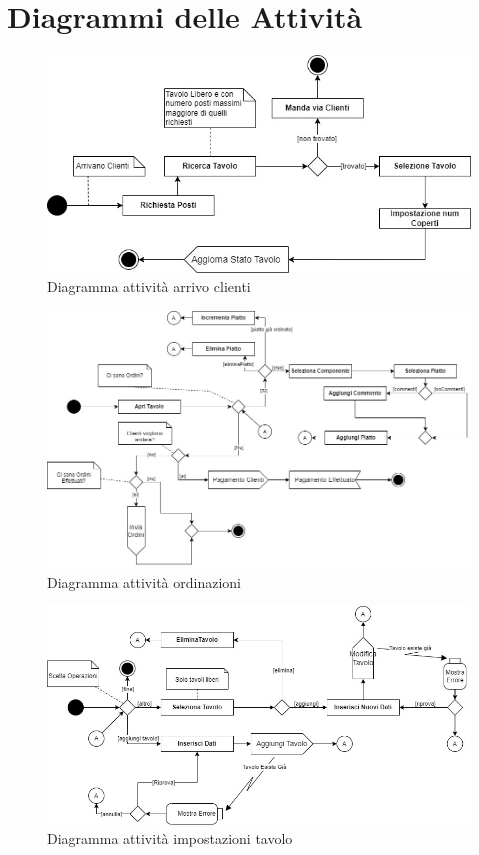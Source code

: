 \documentclass[12pt, letterpaper]{book}
\begin{document}
\newpage

\section{Diagrammi delle Attività}
\begin{figure}[H]
    \centering
    \includegraphics[width =0.9 \linewidth]{../UML/DrawIo/Activity/Activity-ArrivoClienti.jpg}
    \caption{Diagramma attività arrivo clienti}
    \label{UM: A-ArrivoClienti}
\end{figure}
\begin{figure}[H]
    \centering
    \includegraphics[width =0.9 \linewidth]{../UML/DrawIo/Activity/Activity-Ordinazioni.jpg}
    \caption{Diagramma attività ordinazioni}
    \label{UM: A-Ordinazioni}
\end{figure}
\begin{figure}[H]
    \centering
    \includegraphics[width =0.9 \linewidth]{../UML/DrawIo/Activity/Activity-ImpostazioniTavolo.jpg}
    \caption{Diagramma attività impostazioni tavolo}
    \label{UM: A-ImpostazioniTavolo}
\end{figure}
\end{document}

